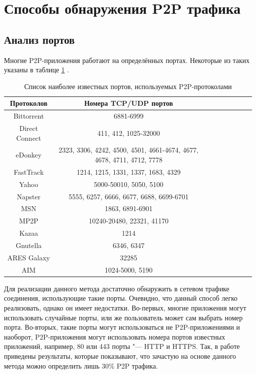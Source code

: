 \documentclass[bachelor, och, coursework]{SCWorks}
\begin{document}
\section{Способы обнаружения P2P трафика}
\subsection{Анализ портов}
Многие P2P-приложения работают на определённых портах. 
Некоторые из таких указаны в таблице \ref{table:p2p-ports} \cite{p2p-list}.

\begin{table}[H]
    \caption{Список наиболее известных портов, используемых P2P-протоколами}
    \label{table:p2p-ports}
    \begin{center}
    {\small
    \begin{tabular}{|c|c|c|c|c|c|c|c|c|}
        \hline
    Протоколов   & Номера TCP/UDP портов \\ \hline
    Bittorrent      & 6881-6999  \\ \hline
    Direct Connect  & 411, 412, 1025-32000  \\ \hline
    eDonkey         & 2323, 3306, 4242, 4500, 4501, 4661-4674, 4677, 4678, 4711, 4712, 7778  \\ \hline
    FastTrack       & 1214, 1215, 1331, 1337, 1683, 4329  \\ \hline
    Yahoo           & 5000-50010, 5050, 5100  \\ \hline
    Napster         & 5555, 6257, 6666, 6677, 6688, 6699-6701  \\ \hline
    MSN             & 1863, 6891-6901 \\ \hline
    MP2P            & 10240-20480, 22321, 41170  \\ \hline
    Kazaa           & 1214  \\ \hline
    Gnutella        & 6346, 6347  \\ \hline
    ARES Galaxy     & 32285  \\ \hline
    AIM             & 1024-5000, 5190  \\ \hline
    \end{tabular}
    }
    \end{center}
\end{table}

Для реализации данного метода достаточно обнаружить в сетевом трафике соединения, использующие такие порты.
Очевидно, что данный способ легко реализовать, однако он имеет недостатки. Во-первых, многие приложения могут
использовать случайные порты, или же пользователь может сам выбрать номер порта. Во-вторых, такие порты могут использоваться не P2P-приложениями и наоборот, P2P-приложения могут использовать номера портов известных приложений, например, 80 или 443 порты "--- HTTP и HTTPS. Так, в работе \cite{30percent}
приведены результаты, которые показывают, что зачастую на основе данного метода можно определить лишь 30\% P2P трафика.
\end{document}
